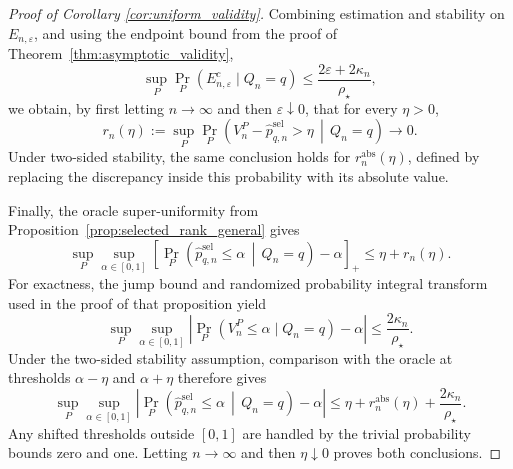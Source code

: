 \documentclass[10pt]{article}
\begin{document}
\begin{proof}[Proof of Corollary \ref{cor:uniform_validity}]
Combining estimation and stability on $E_{n,\varepsilon}$, and using the endpoint bound from the proof of Theorem~\ref{thm:asymptotic_validity},
\[
\sup_P\Pr_P(E_{n,\varepsilon}^c\mid Q_n=q)
\le\frac{2\varepsilon+2\kappa_n}{\rho_\star},
\]
we obtain, by first letting $n\to\infty$ and then $\varepsilon\downarrow0$, that for every $\eta>0$,
\[
r_n(\eta):=
\sup_P\Pr_P\!\left(
V_n^P-\widehat p^{\mathrm{sel}}_{q,n}>\eta
\,\middle|\,Q_n=q
\right)\to0.
\]
Under two-sided stability, the same conclusion holds for
$r_n^{\mathrm{abs}}(\eta)$, defined by replacing the discrepancy inside this probability with its absolute value.

Finally, the oracle super-uniformity from Proposition~\ref{prop:selected_rank_general} gives
\[
\sup_P\sup_{\alpha\in[0,1]}
\left[
\Pr_P\!\left(
\widehat p^{\mathrm{sel}}_{q,n}\le\alpha
\,\middle|\,Q_n=q
\right)-\alpha
\right]_+
\le\eta+r_n(\eta).
\]
For exactness, the jump bound and randomized probability integral transform used in the proof of that proposition yield
\[
\sup_P\sup_{\alpha\in[0,1]}
\left|
\Pr_P(V_n^P\le\alpha\mid Q_n=q)-\alpha
\right|
\le\frac{2\kappa_n}{\rho_\star}.
\]
Under the two-sided stability assumption, comparison with the oracle at thresholds $\alpha-\eta$ and $\alpha+\eta$ therefore gives
\[
\sup_P\sup_{\alpha\in[0,1]}
\left|
\Pr_P\!\left(
\widehat p^{\mathrm{sel}}_{q,n}\le\alpha
\,\middle|\,Q_n=q
\right)-\alpha
\right|
\le
\eta+r_n^{\mathrm{abs}}(\eta)
+\frac{2\kappa_n}{\rho_\star}.
\]
Any shifted thresholds outside $[0,1]$ are handled by the trivial probability bounds zero and one. Letting $n\to\infty$ and then $\eta\downarrow0$ proves both conclusions.
\end{proof}
\end{document}
